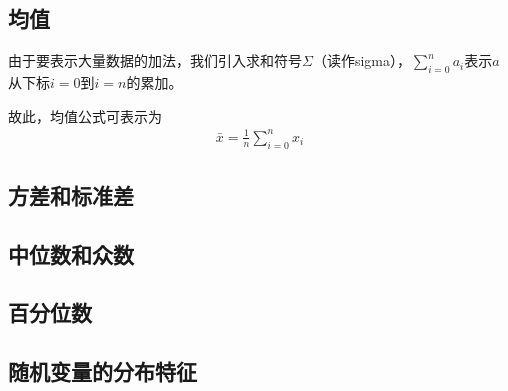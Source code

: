 \subsection{均值}
由于要表示大量数据的加法，我们引入求和符号$\Sigma$（读作sigma），${\displaystyle\sum_{i=0}^n a_i}$表示$a$从下标$i=0$到$i=n$的累加。

故此，均值公式可表示为
\begin{gather}
	\bar{x}=\frac{1}{n}\sum_{i=0}^n x_i \label{equ:mean-1}
\end{gather}

\subsection{方差和标准差}
\subsection{中位数和众数}
\subsection{百分位数}
\subsection{随机变量的分布特征}
